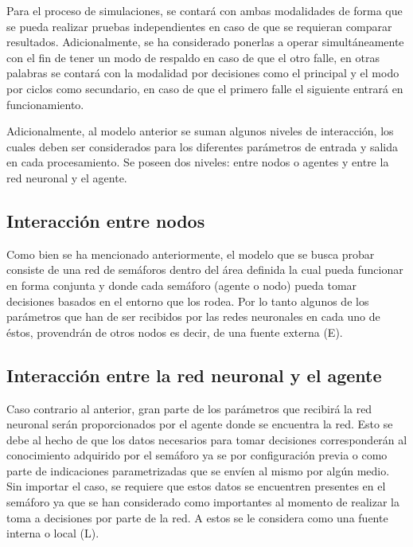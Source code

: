 Para el proceso de simulaciones, se contar\'{a} con ambas modalidades de forma que se pueda realizar pruebas independientes en caso de que se requieran comparar resultados. Adicionalmente, se ha considerado ponerlas a operar simult\'{a}neamente con el fin de tener un modo de respaldo en caso de que el otro falle, en otras palabras se contar\'{a} con la modalidad por decisiones como el principal y el modo por ciclos como secundario, en caso de que el primero falle el siguiente entrar\'{a} en funcionamiento.

Adicionalmente, al modelo anterior se suman algunos niveles de interacci\'{o}n, los cuales deben ser considerados para los diferentes par\'{a}metros de entrada y salida en cada procesamiento. Se poseen dos niveles: entre nodos o agentes y entre la red neuronal y el agente.


\subsection{Interacci\'{o}n entre nodos}

Como bien se ha mencionado anteriormente, el modelo que se busca probar consiste de una red de sem\'{a}foros dentro del \'{a}rea definida la cual pueda funcionar en forma conjunta y donde cada sem\'{a}foro (agente o nodo) pueda tomar decisiones basados en el entorno que los rodea. Por lo tanto algunos de los par\'{a}metros que han de ser recibidos por las redes neuronales en cada uno de \'{e}stos, provendr\'{a}n de otros nodos es decir, de una fuente externa (E).

\subsection{Interacci\'{o}n entre la red neuronal y el agente}

Caso contrario al anterior, gran parte de los par\'{a}metros que recibir\'{a} la red neuronal ser\'{a}n proporcionados por el agente donde se encuentra la red. Esto se debe al hecho de que los datos necesarios para tomar decisiones corresponder\'{a}n al conocimiento adquirido por el sem\'{a}foro ya se por configuraci\'{o}n previa o como parte de indicaciones parametrizadas que se env\'{i}en al mismo por alg\'{u}n medio. Sin importar el caso, se requiere que estos datos se encuentren presentes en el sem\'{a}foro ya que se han considerado como importantes al momento de realizar la toma a decisiones por parte de la red. A estos se le considera como una fuente interna o local (L).

